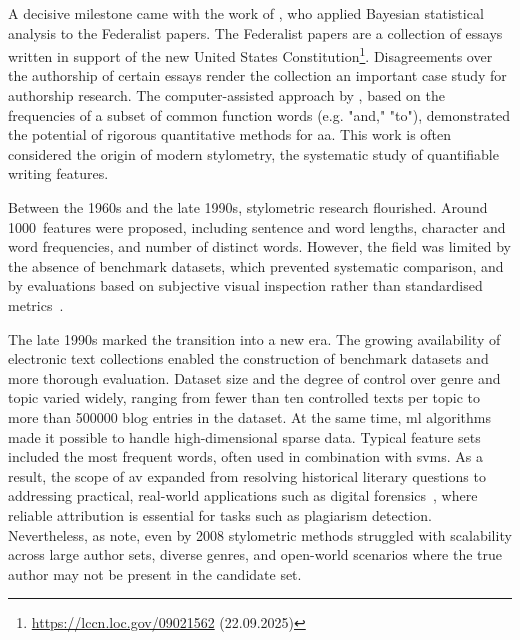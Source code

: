 

A decisive milestone came with the work of \citet{mosteller_1964}, who applied Bayesian statistical analysis to the Federalist papers.
The Federalist papers are a collection of essays written in support of the new United States Constitution\footnote{\url{https://lccn.loc.gov/09021562} (22.09.2025)}.
Disagreements over the authorship of certain essays render the collection an important case study for authorship research.
The computer-assisted approach by \citet{mosteller_1964}, based on the frequencies of a subset of common function words (e.g. "and," "to"), demonstrated the potential of rigorous quantitative methods for \ac{aa}. 
This work is often considered the origin of modern stylometry, the systematic study of quantifiable writing features.

Between the 1960s and the late 1990s, stylometric research flourished.
Around \num{1000}~features were proposed, including sentence and word lengths, character and word frequencies, and number of distinct words. 
However, the field was limited by the absence of benchmark datasets, which prevented systematic comparison, and by evaluations based on subjective visual inspection rather than standardised metrics~\citep{stamatatos_survey_2009}.

The late 1990s marked the transition into a new era. 
The growing availability of electronic text collections enabled the construction of benchmark datasets and more thorough evaluation. 
Dataset size and the degree of control over genre and topic varied widely, ranging from fewer than ten controlled texts per topic to more than \num{500000} blog entries in the \dataBlog{} dataset. %
At the same time, \ac{ml} algorithms made it possible to handle high-dimensional sparse data. 
Typical feature sets included the most frequent words, often used in combination with \acp{svm}.
As a result, the scope of \ac{av} expanded from resolving historical literary questions to addressing practical, real-world applications such as digital forensics~\citep{stamatatos_survey_2009}, where reliable attribution is essential for tasks such as plagiarism detection.
Nevertheless, as \citet{abbasi_writeprints_2008} note, even by 2008 stylometric methods struggled with scalability across large author sets, diverse genres, and open-world scenarios where the true author may not be present in the candidate set.

